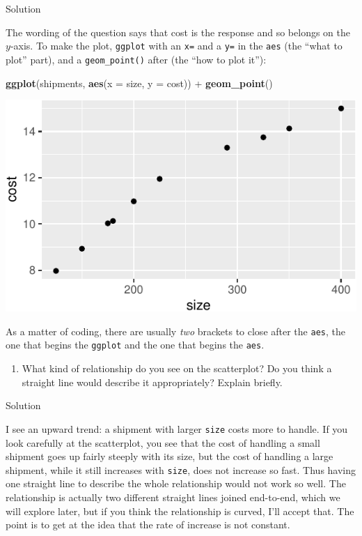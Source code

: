 \documentclass[]{tufte-book}
\newenvironment{Shaded}{}{}
\newcommand{\DataTypeTok}[1]{\textcolor[rgb]{0.56,0.13,0.00}{#1}}
\newcommand{\KeywordTok}[1]{\textcolor[rgb]{0.00,0.44,0.13}{\textbf{#1}}}
\newcommand{\NormalTok}[1]{#1}
\newcommand{\OperatorTok}[1]{\textcolor[rgb]{0.40,0.40,0.40}{#1}}
\newcommand{\StringTok}[1]{\textcolor[rgb]{0.25,0.44,0.63}{#1}}
\providecommand{\tightlist}{%
  \setlength{\itemsep}{0pt}\setlength{\parskip}{0pt}}
\theoremstyle{definition}
\theoremstyle{definition}
\theoremstyle{definition}
\theoremstyle{remark}
\begin{document}
Solution

The wording of the question says that cost is the response and so
belongs on the \(y\)-axis. To make the plot, \texttt{ggplot} with an
\texttt{x=} and a \texttt{y=} in the \texttt{aes} (the ``what to plot''
part), and a \texttt{geom\_point()} after (the ``how to plot it''):

\begin{Shaded}
\begin{Highlighting}[]
\KeywordTok{ggplot}\NormalTok{(shipments, }\KeywordTok{aes}\NormalTok{(}\DataTypeTok{x =}\NormalTok{ size, }\DataTypeTok{y =}\NormalTok{ cost)) }\OperatorTok{+}\StringTok{ }\KeywordTok{geom_point}\NormalTok{()}
\end{Highlighting}
\end{Shaded}

\includegraphics{02-reading-in_files/figure-latex/unnamed-chunk-23-1}

As a matter of coding, there are usually \emph{two} brackets to close
after the \texttt{aes}, the one that begins the \texttt{ggplot} and the
one that begins the \texttt{aes}.

\begin{enumerate}
\def\labelenumi{(\alph{enumi})}
\setcounter{enumi}{2}
\tightlist
\item
  What kind of relationship do you see on the scatterplot? Do you think
  a straight line would describe it appropriately? Explain briefly.
\end{enumerate}

Solution

I see an upward trend: a shipment with larger \texttt{size} costs more
to handle. If you look carefully at the scatterplot, you see that the
cost of handling a small shipment goes up fairly steeply with its size,
but the cost of handling a large shipment, while it still increases with
\texttt{size}, does not increase so fast. Thus having one straight line
to describe the whole relationship would not work so well. The
relationship is actually two different straight lines joined end-to-end,
which we will explore later, but if you think the relationship is
curved, I'll accept that. The point is to get at the idea that the rate
of increase is not constant.
\end{document}
